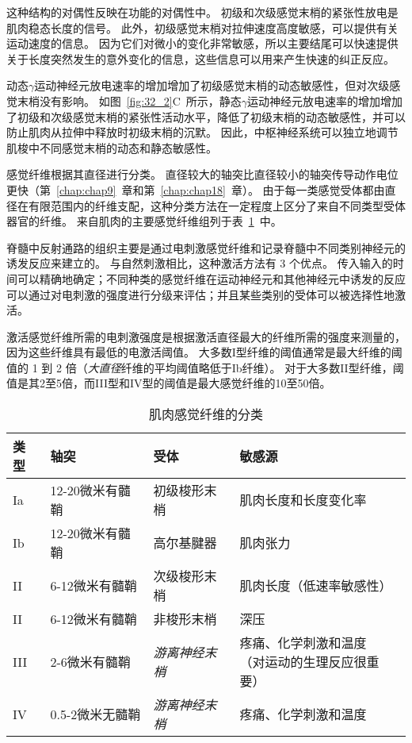 \begin{proposition}[肌梭]
	\quad \quad 这种结构的对偶性反映在功能的对偶性中。
	初级和次级感觉末梢的紧张性放电是肌肉稳态长度的信号。
	此外，初级感觉末梢对拉伸速度高度敏感，可以提供有关运动速度的信息。
	因为它们对微小的变化非常敏感，所以主要结尾可以快速提供关于长度突然发生的意外变化的信息，这些信息可以用来产生快速的纠正反应。
	
	\quad \quad 动态$ \gamma $运动神经元放电速率的增加增加了初级感觉末梢的动态敏感性，但对次级感觉末梢没有影响。
	如图~\ref{fig:32_2}C~所示，静态$ \gamma $运动神经元放电速率的增加增加了初级和次级感觉末梢的紧张性活动水平，降低了初级末梢的动态敏感性，并可以防止肌肉从拉伸中释放时初级末梢的沉默。
	因此，中枢神经系统可以独立地调节肌梭中不同感觉末梢的动态和静态敏感性。
	
\end{proposition}


\begin{proposition}[肌肉感觉纤维的分类] \label{box:32_2}
	
	\quad \quad 感觉纤维根据其直径进行分类。
	直径较大的轴突比直径较小的轴突传导动作电位更快（第~\ref{chap:chap9}~章和第~\ref{chap:chap18}~章）。
	由于每一类感觉受体都由直径在有限范围内的纤维支配，这种分类方法在一定程度上区分了来自不同类型受体器官的纤维。
	来自肌肉的主要感觉纤维组列于表~\ref{tab:32_1}~中。
	
	\quad \quad 脊髓中反射通路的组织主要是通过电刺激感觉纤维和记录脊髓中不同类别神经元的诱发反应来建立的。
	与自然刺激相比，这种激活方法有 3 个优点。
	传入输入的时间可以精确地确定；不同种类的感觉纤维在运动神经元和其他神经元中诱发的反应可以通过对电刺激的强度进行分级来评估；并且某些类别的受体可以被选择性地激活。
	
	\quad \quad 激活感觉纤维所需的电刺激强度是根据激活直径最大的纤维所需的强度来测量的，因为这些纤维具有最低的电激活阈值。
	大多数I型纤维的阈值通常是最大纤维的阈值的 1 到 2 倍（\textit{大直径}纤维的平均阈值略低于Ib纤维）。
	对于大多数II型纤维，阈值是其2至5倍，而III型和IV型的阈值是最大感觉纤维的10至50倍。
	
\end{proposition}


\begin{table}[htbp]
	\caption{肌肉感觉纤维的分类} \label{tab:32_1} \centering
	\begin{tabular}{llll}
		\toprule
		类型 & 轴突 & 受体 & 敏感源 \\
		\midrule
		Ia & 12-20微米有髓鞘 & 初级梭形末梢 & 肌肉长度和长度变化率 \\
		Ib & 12-20微米有髓鞘 & 高尔基腱器 & 肌肉张力 \\
		II & 6-12微米有髓鞘 & 次级梭形末梢 & 肌肉长度（低速率敏感性） \\
		II & 6-12微米有髓鞘 & 非梭形末梢 & 深压 \\
		III & 2-6微米有髓鞘 & \textit{游离神经末梢} & \makecell[l]{疼痛、化学刺激和温度\\（对运动的生理反应很重要}） \\
		IV & 0.5-2微米无髓鞘 & \textit{游离神经末梢} & 疼痛、化学刺激和温度 \\
		\bottomrule
	\end{tabular}
\end{table}


